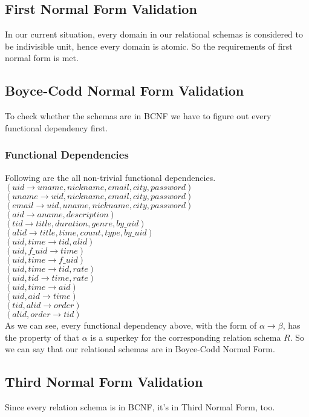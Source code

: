 \documentclass[letterpaper, 12pt]{report}
\begin{document}
	\subsection{First Normal Form Validation}
	In our current situation, every domain in our relational schemas is considered to be indivisible unit, hence every domain is atomic. So the requirements of first normal form is met.
	\subsection{Boyce-Codd Normal Form Validation}
	To check whether the schemas are in BCNF we have to figure out every functional dependency first.
	\subsubsection{Functional Dependencies}
	Following are the all non-trivial functional dependencies.\\
	$(uid\to uname, nickname, email, city, password)$\\
	$(uname\to uid, nickname, email, city, password)$\\
	$(email\to uid, uname ,nickname, city, password)$\\
	$(aid\to aname, description)$\\
	$(tid\to title, duration, genre, by\_aid)$\\
	$(alid\to title, time, count, type, by\_uid)$\\
	$(uid, time\to tid, alid)$\\
	$(uid, f\_uid\to time)$\\
	$(uid, time\to f\_uid)$\\
	$(uid, time\to tid, rate)$\\
	$(uid, tid\to time, rate)$\\
	$(uid, time\to aid)$\\
	$(uid, aid\to time)$\\
	$(tid, alid\to order)$\\
	$(alid, order\to tid)$\\
	As we can see, every functional dependency above, with the form of $\alpha \to \beta$, has the property of that $\alpha$ is a superkey for the corresponding relation schema $R$. So we can say that our relational schemas are in Boyce-Codd Normal Form.
	
	\subsection{Third Normal Form Validation}
	Since every relation schema is in BCNF, it's in Third Normal Form, too.
\end{document}
